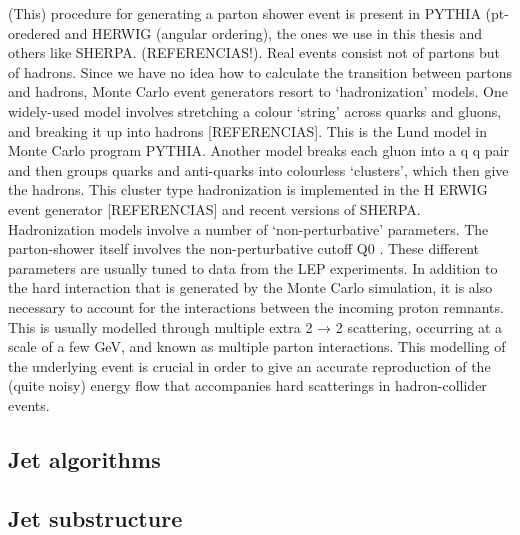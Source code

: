 (This) procedure for generating a parton shower event is present in PYTHIA (pt-oredered and HERWIG (angular ordering), the ones we use in this thesis and others like SHERPA. (REFERENCIAS!). 
Real events consist not of partons but of hadrons. Since we have no idea how to calculate the transition between partons and hadrons, Monte Carlo event generators resort to ‘hadronization’ models. One widely-used model involves stretching a colour ‘string’ across quarks and gluons, and breaking it up into hadrons [REFERENCIAS]. This is the Lund model  in Monte Carlo program PYTHIA.
Another model breaks each gluon into a q q pair and then groups quarks and anti-quarks into colourless ‘clusters’, which then give the hadrons. This cluster type hadronization is implemented in the H ERWIG event generator [REFERENCIAS] and recent versions of SHERPA.
Hadronization models involve a number of ‘non-perturbative’ parameters. The parton-shower
itself involves the non-perturbative cutoff Q0 . These different parameters are usually tuned to data from
the LEP experiments.
In addition to the hard interaction that is generated by the Monte Carlo
simulation, it is also necessary to account for the interactions between the incoming proton 
remnants. This is usually modelled through multiple extra 2 → 2 scattering, occurring at a scale of a
few GeV, and known as multiple parton interactions. This modelling of the underlying event is crucial in
order to give an accurate reproduction of the (quite noisy) energy flow that accompanies hard scatterings
in hadron-collider events.



\subsection{Jet algorithms}

\subsection{Jet substructure}
